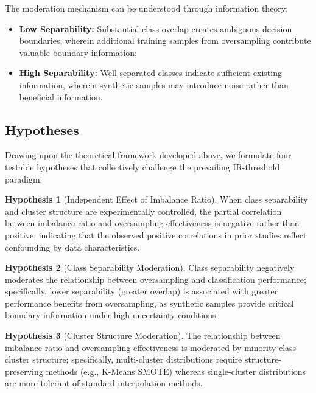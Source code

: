\documentclass{ijSmartGrid}
\theoremstyle{definition}
\newtheorem{hypothesis}{Hypothesis}
\begin{document}
\indent The moderation mechanism can be understood through information theory:
\begin{itemize}
    \item \textbf{Low Separability:} Substantial class overlap creates ambiguous decision boundaries, wherein additional training samples from oversampling contribute valuable boundary information;
    \item \textbf{High Separability:} Well-separated classes indicate sufficient existing information, wherein synthetic samples may introduce noise rather than beneficial information.
\end{itemize}

\subsection{Hypotheses}

\indent Drawing upon the theoretical framework developed above, we formulate four testable hypotheses that collectively challenge the prevailing IR-threshold paradigm:

\begin{hypothesis}[Independent Effect of Imbalance Ratio]
When class separability and cluster structure are experimentally controlled, the partial correlation between imbalance ratio and oversampling effectiveness is negative rather than positive, indicating that the observed positive correlations in prior studies reflect confounding by data characteristics.
\label{hyp:h1}
\end{hypothesis}

\begin{hypothesis}[Class Separability Moderation]
Class separability negatively moderates the relationship between oversampling and classification performance; specifically, lower separability (greater overlap) is associated with greater performance benefits from oversampling, as synthetic samples provide critical boundary information under high uncertainty conditions.
\label{hyp:h2}
\end{hypothesis}

\begin{hypothesis}[Cluster Structure Moderation]
The relationship between imbalance ratio and oversampling effectiveness is moderated by minority class cluster structure; specifically, multi-cluster distributions require structure-preserving methods (e.g., K-Means SMOTE) whereas single-cluster distributions are more tolerant of standard interpolation methods.
\label{hyp:h3}
\end{hypothesis}
\end{document}
